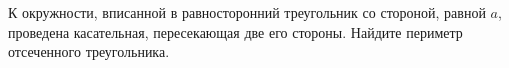 \begin{ex}
	\begin{condition}
		К окружности, вписанной в равносторонний треугольник со стороной, равной \( a \), проведена касательная, пересекающая две его стороны. Найдите периметр отсеченного треугольника.
	\end{condition}
\end{ex}